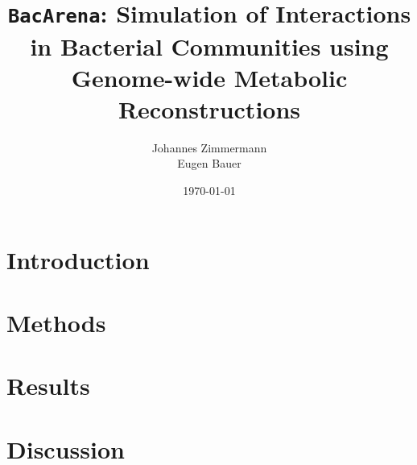 \documentclass{scrartcl}
\title{\texttt{BacArena}: Simulation of Interactions in Bacterial Communities using Genome-wide Metabolic Reconstructions}
\author{Johannes Zimmermann\\Eugen Bauer}
\date{\today}
\begin{document}
\maketitle
\tableofcontents

\section{Introduction}


\section{Methods}


\section{Results}


\section{Discussion}

  
\printbibliography 
\end{document}
